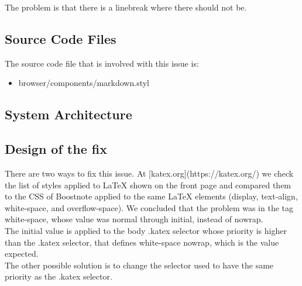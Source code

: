 \documentclass[main.tex]{subfiles}
\begin{document}
The problem is that there is a linebreak where there should not be.

\subsection{Source Code Files}

The source code file that is involved with this issue is:

\begin{itemize}
\item  browser/components/markdown.styl
\end{itemize}

\subsection{System Architecture}

\subsection{Design of the fix}

There are two ways to fix this issue. At [katex.org](https://katex.org/) we check the list of styles applied to LaTeX shown on the front page and compared them to the CSS of Boostnote applied to the same LaTeX elements (display, text-align, white-space, and overflow-space). We concluded that the problem was in the tag white-space, whose value was normal through initial, instead of nowrap.\\

The initial value is applied to the body .katex selector whose priority is higher than the .katex selector, that defines white-space nowrap, which is the value expected.\\

The other possible solution is to change the selector used to have the same priority as the .katex selector.

\nocite{*}
\end{document}
